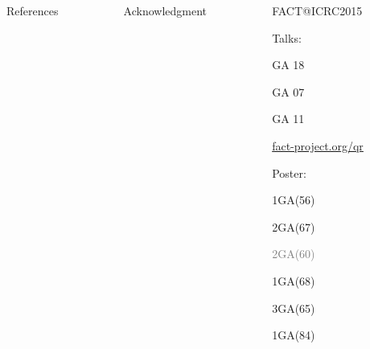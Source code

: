 \vfill
\begin{columns}[t, onlytextwidth]%
  \begin{column}{0.42\textwidth}%
    \begin{block}[equal height group=bottom]{\normalsize References}
      \footnotesize%
      \printbibliography%
    \end{block}
  \end{column}%
  \begin{column}{0.42\textwidth}%
    \begin{block}[equal height group=bottom]{\normalsize Acknowledgment}
      \begin{multicols}{2}%
        \footnotesize
        
      \end{multicols}%
    \end{block}
  \end{column}%
  \begin{column}{0.16\textwidth}%
    \footnotesize
    \begin{block}[equal height group=bottom]{\normalsize FACT@ICRC2015}
      \begin{multicols}{2}
        Talks:
        \begin{description}[align=right, labelwidth=1.70cm, nosep]
          \item[704] GA 18
          \item[806] GA 07
          \item[1032] GA 11
        \end{description}
        \vspace{0.5cm}
        \centering

        {\tiny\vspace{0.25cm}\url{fact-project.org/qr}\par}
        \columnbreak
        Poster:
        \begin{description}[align=right, labelwidth=1.3cm, nosep]
          \item[706] 1GA(56)
          \item[707] 2GA(67)
          \item[\textcolor{gray}{733}] \textcolor{gray}{2GA(60)}
          \item[863] 1GA(68)
          \item[865] 3GA(65)
          \item[976] 1GA(84)
        \end{description}
      \end{multicols}
    \end{block}
  \end{column}%
\end{columns}%

